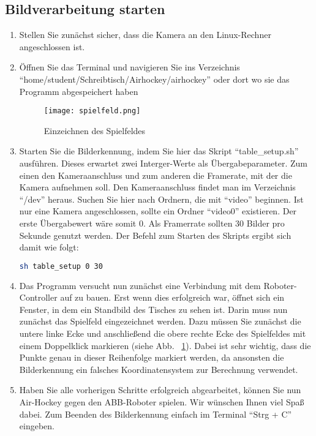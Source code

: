 \subsection{Bildverarbeitung starten}
\begin{enumerate}
\item Stellen Sie zunächst sicher, dass die Kamera an den Linux-Rechner angeschlossen ist.

\item Öffnen Sie das Terminal und navigieren Sie ins Verzeichnis \enquote{home/student/Schreibtisch/Airhockey/airhockey} oder dort wo sie das Programm abgespeichert haben


\begin{figure}[htbp]
\centering
\texttt{[image: spielfeld.png]}
\caption{Einzeichnen des Spielfeldes} 
\label{spielfeld}
\end{figure}

\item Starten Sie die Bilderkennung, indem Sie hier das Skript \enquote{table\_setup.sh} ausführen. Dieses erwartet zwei Interger-Werte als Übergabeparameter. Zum einen den Kameraanschluss und zum anderen die Framerate, mit der die Kamera aufnehmen soll. Den Kameraanschluss findet man im Verzeichnis \enquote{/dev} heraus. Suchen Sie hier nach Ordnern, die mit \enquote{video} beginnen. Ist nur eine Kamera angeschlossen, sollte ein Ordner \enquote{video0} existieren. Der erste Übergabewert wäre somit 0. Als Framerrate sollten 30 Bilder pro Sekunde genutzt werden. Der Befehl zum Starten des Skripts ergibt sich damit wie folgt:

\begin{lstlisting}[caption=Terminal-Befahl zum starten der Bilderkennung, label=start, language=bash]
sh table_setup 0 30
\end{lstlisting} 

\item Das Programm versucht nun zunächst eine Verbindung mit dem Roboter-Controller auf zu bauen. Erst wenn dies erfolgreich war, öffnet sich ein Fenster, in dem ein Standbild des Tisches zu sehen ist. Darin muss nun zunächst das Spielfeld eingezeichnet werden. Dazu müssen Sie zunächst die untere linke Ecke und anschließend die obere rechte Ecke des Spielfeldes mit einem Doppelklick markieren (siehe Abb. ~\ref{spielfeld}). Dabei ist sehr wichtig, dass die Punkte genau in dieser Reihenfolge markiert werden, da ansonsten die Bilderkennung ein falsches Koordinatensystem zur Berechnung verwendet.   

\item Haben Sie alle vorherigen Schritte erfolgreich abgearbeitet, können Sie nun Air-Hockey gegen den ABB-Roboter spielen. Wir wünschen Ihnen viel Spaß dabei. Zum Beenden des Bilderkennung einfach im Terminal \enquote{Strg + C} eingeben.   

\end{enumerate} 

